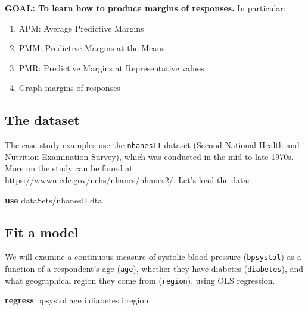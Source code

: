 \documentclass[
]{book}
\newenvironment{Shaded}{\begin{snugshade}}{\end{snugshade}}
\newcommand{\KeywordTok}[1]{\textcolor[rgb]{0.13,0.29,0.53}{\textbf{#1}}}
\newcommand{\NormalTok}[1]{#1}
\providecommand{\tightlist}{%
  \setlength{\itemsep}{0pt}\setlength{\parskip}{0pt}}
\begin{document}
\begin{alert}

\textbf{GOAL: To learn how to produce margins of responses.} In particular:

\begin{enumerate}
\def\labelenumi{\arabic{enumi}.}
\tightlist
\item
  APM: Average Predictive Margins\\
\item
  PMM: Predictive Margins at the Means
\item
  PMR: Predictive Margins at Representative values
\item
  Graph margins of responses
\end{enumerate}

\end{alert}

\hypertarget{the-dataset-2}{%
\subsection{The dataset}\label{the-dataset-2}}

The case study examples use the \texttt{nhanesII} dataset (Second National Health and Nutrition Examination Survey),
which was conducted in the mid to late 1970s. More on the study can be found at \url{https://wwwn.cdc.gov/nchs/nhanes/nhanes2/}. Let's load the data:

\begin{Shaded}
\begin{Highlighting}[]
\KeywordTok{use}\NormalTok{ dataSets/nhanesII.dta}
\end{Highlighting}
\end{Shaded}

\hypertarget{fit-a-model}{%
\subsection{Fit a model}\label{fit-a-model}}

We will examine a continuous measure of systolic blood pressure (\texttt{bpsystol}) as a function of a respondent's age (\texttt{age}), whether they have diabetes (\texttt{diabetes}), and what geographical region they come from (\texttt{region}), using OLS regression.

\begin{Shaded}
\begin{Highlighting}[]
\KeywordTok{regress}\NormalTok{ bpsystol age i.diabetes i.region}
\end{Highlighting}
\end{Shaded}
\end{document}
